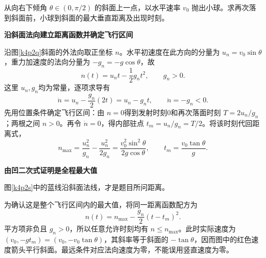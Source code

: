 \begin{question}\begin{example}[水平抛出后离斜面最远]\label{k4p2}
从向右下倾角 $\theta\in(0,\pi/2)$ 的斜面上一点，以水平速率 $v_0$ 抛出小球。求再次落到斜面前，小球到斜面的最大垂直距离及出现时刻。\end{example}
\end{question}
\begin{solution}\textbf{沿斜面法向建立距离函数并确定飞行区间}\par\nobreak
沿图\ref{k4p2q}斜面的外法向取正坐标 $n$。水平初速度在此方向的分量为 $u_n=v_0\sin\theta$，重力加速度的法向分量为 $-g_n=-g\cos\theta$，故
\[n(t)=u_nt-\frac12g_nt^2,\qquad g_n>0.\]
这里 $u_n,g_n$均为常量，逐项求导有
\[\dot n=u_n-\frac{g_n}{2}(2t)=u_n-g_nt,\qquad
 \ddot n=-g_n<0.\]
先用位置条件确定飞行区间：由 $n=0$得到发射时刻0和再次落面时刻 $T=2u_n/g_n$；两根之间 $n>0$。再令 $\dot n=0$，得内部驻点 $t_m=u_n/g_n=T/2$。将该时刻代回距离式，
\[n_{\max}=\frac{u_n^2}{g_n}-\frac{u_n^2}{2g_n}
 =\boxed{\frac{v_0^2\sin^2\theta}{2g\cos\theta}},
\qquad\boxed{t_m=\frac{v_0\tan\theta}{g}}.\]



\par\medskip{}\noindent\textbf{由凹二次式证明是全程最大值}\par\nobreak
图\ref{k4p2s}中的蓝线沿斜面法线，才是题目所问距离。

为确认这是整个飞行区间内的最大值，将同一距离函数配方为
\[n(t)=n_{\max}-\frac{g_n}{2}(t-t_m)^2.\]
平方项非负且 $g_n>0$，所以任意允许时刻均有 $n\le n_{\max}$。此时实际速度为 $(v_0,-gt_m)=(v_0,-v_0\tan\theta)$，其斜率等于斜面的 $-\tan\theta$，因而图中的红色速度箭头平行斜面。最远条件对应法向速度为零，不能误用竖直速度为零。




\end{solution}
